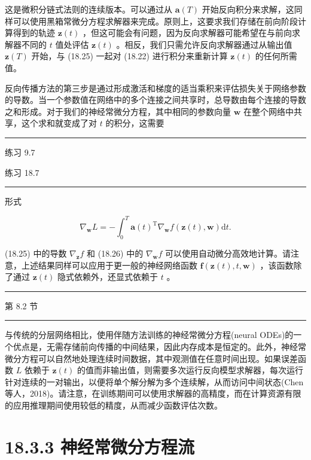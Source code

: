 \documentclass[10pt]{report}
\newcommand{\HRule}{\begin{center}\rule{0.9\linewidth}{0.2mm}\end{center}}
\begin{document}
这是微积分链式法则的连续版本。可以通过从 \(\mathbf{a}\left( T\right)\) 开始反向积分来求解，这同样可以使用黑箱常微分方程求解器来完成。原则上，这要求我们存储在前向阶段计算得到的轨迹 \(\mathbf{z}\left( t\right)\) ，但这可能会有问题，因为反向求解器可能希望在与前向求解器不同的 \(t\) 值处评估 \(\mathbf{z}\left( t\right)\) 。相反，我们只需允许反向求解器通过从输出值 \(\mathbf{z}\left( T\right)\) 开始，与 (18.25) 一起对 (18.22) 进行积分来重新计算 \(\mathbf{z}\left( t\right)\) 的任何所需值。

反向传播方法的第三步是通过形成激活和梯度的适当乘积来评估损失关于网络参数的导数。当一个参数值在网络中的多个连接之间共享时，总导数由每个连接的导数之和形成。对于我们的神经常微分方程，其中相同的参数向量 \(\mathbf{w}\) 在整个网络中共享，这个求和就变成了对 \(t\) 的积分，这需要

\HRule

练习 9.7

练习 18.7

\HRule

形式

\[
{\nabla }_{\mathbf{w}}L =  - {\int }_{0}^{T}\mathbf{a}{\left( t\right) }^{\mathrm{T}}{\nabla }_{\mathbf{w}}f\left( {\mathbf{z}\left( t\right) ,\mathbf{w}}\right) \mathrm{d}t. \tag{18.26}
\]

(18.25) 中的导数 \({\nabla }_{\mathbf{z}}f\) 和 (18.26) 中的 \({\nabla }_{\mathbf{w}}f\) 可以使用自动微分高效地计算。请注意，上述结果同样可以应用于更一般的神经网络函数 \(\mathbf{f}\left( {\mathbf{z}\left( t\right) ,t,\mathbf{w}}\right)\) ，该函数除了通过 \(\mathbf{z}\left( t\right)\) 隐式依赖外，还显式依赖于 \(t\) 。

\HRule

第 8.2 节

\HRule

与传统的分层网络相比，使用伴随方法训练的神经常微分方程(neural ODEs)的一个优点是，无需存储前向传播的中间结果，因此内存成本是恒定的。此外，神经常微分方程可以自然地处理连续时间数据，其中观测值在任意时间出现。如果误差函数 \(L\) 依赖于 \(\mathbf{z}\left( t\right)\) 的值而非输出值，则需要多次运行反向模型求解器，每次运行针对连续的一对输出，以便将单个解分解为多个连续解，从而访问中间状态(Chen 等人，2018)。请注意，在训练期间可以使用求解器的高精度，而在计算资源有限的应用推理期间使用较低的精度，从而减少函数评估次数。

\section*{18.3.3 神经常微分方程流}
\end{document}
